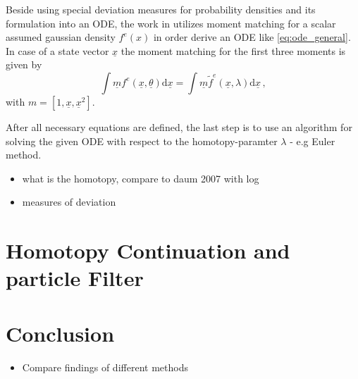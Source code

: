 \documentclass[a4paper]{IEEEtran}
\begin{document}
Beside using special deviation measures for probability densities and its formulation into an ODE, the work in \cite{hanebeck2012a} utilizes moment matching for a scalar assumed gaussian density $f^{e}(x)$ in order derive an ODE like \eqref{eq:ode_general}. In case of a state vector $\underline{x}$
the moment matching for the first three moments is given by
\begin{equation}
    \int \underline{m}f^{e}(\underline{x},\underline{\theta}) \mathrm{d}\underline{x} = \int \underline{m} \tilde{f}^{e}(\underline{x}, \lambda) \mathrm{d}\underline{x} \,,
    \label{eq:moment_matching_div}
\end{equation}
with $m = \left[ 1, \underline{x}, \underline{x}^2 \right]$.

After all necessary equations are defined, the last step is to use an algorithm for solving the given ODE with respect to the homotopy-paramter $\lambda$ - e.g Euler method.

\label{ch:homotopy_approximation}
\begin{itemize}
    \item what is the homotopy, compare to daum 2007 with log 
    \item measures of deviation 
\end{itemize}
\section{Homotopy Continuation and particle Filter}
\label{ch:homotopy_particle_filter}


\section{Conclusion}
\label{ch:conclusion}
\begin{itemize}
    \item Compare findings of different methods
\end{itemize}




\end{document}
